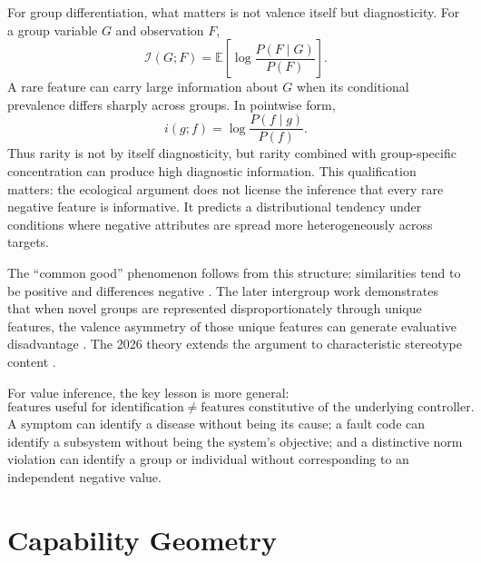 \documentclass[11pt]{article}
\newcommand{\E}{\mathbb{E}}
\newcommand{\I}{\mathcal{I}}
\begin{document}
For group differentiation, what matters is not valence itself but diagnosticity. For a group variable $G$ and observation $F$,
\begin{equation}
    \I(G;F)
    =
    \E\left[
      \log
      \frac{P(F\mid G)}{P(F)}
    \right].
    \label{eq:mutualinfo}
\end{equation}
A rare feature can carry large information about $G$ when its conditional prevalence differs sharply across groups. In pointwise form,
\begin{equation}
    i(g;f)
    =
    \log
    \frac{P(f\mid g)}{P(f)}.
\end{equation}
Thus rarity is not by itself diagnosticity, but rarity combined with group-specific concentration can produce high diagnostic information. This qualification matters: the ecological argument does not license the inference that every rare negative feature is informative. It predicts a distributional tendency under conditions where negative attributes are spread more heterogeneously across targets.

The ``common good'' phenomenon follows from this structure: similarities tend to be positive and differences negative \citep{AlvesKochUnkelbach2017Common}. The later intergroup work demonstrates that when novel groups are represented disproportionately through unique features, the valence asymmetry of those unique features can generate evaluative disadvantage \citep{AlvesKochUnkelbach2018}. The 2026 theory extends the argument to characteristic stereotype content \citep{UnkelbachWeitzelAlves2026}.

For value inference, the key lesson is more general:
\begin{equation}
    \boxed{
    \text{features useful for identification}
    \neq
    \text{features constitutive of the underlying controller}.
    }
    \label{eq:identification}
\end{equation}
A symptom can identify a disease without being its cause; a fault code can identify a subsystem without being the system's objective; and a distinctive norm violation can identify a group or individual without corresponding to an independent negative value.

\section{Capability Geometry}
\end{document}
